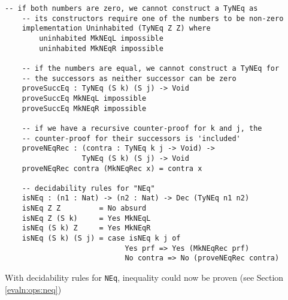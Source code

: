     \begin{lstlisting}[caption={Decidability rules for inequality}]
    -- if both numbers are zero, we cannot construct a TyNEq as
    -- its constructors require one of the numbers to be non-zero
    implementation Uninhabited (TyNEq Z Z) where
        uninhabited MkNEqL impossible
        uninhabited MkNEqR impossible

    -- if the numbers are equal, we cannot construct a TyNEq for      
    -- the successors as neither successor can be zero
    proveSuccEq : TyNEq (S k) (S j) -> Void
    proveSuccEq MkNEqL impossible
    proveSuccEq MkNEqR impossible
    
    -- if we have a recursive counter-proof for k and j, the
    -- counter-proof for their successors is 'included'
    proveNEqRec : (contra : TyNEq k j -> Void) ->
                  TyNEq (S k) (S j) -> Void
    proveNEqRec contra (MkNEqRec x) = contra x
    
    -- decidability rules for "NEq"
    isNEq : (n1 : Nat) -> (n2 : Nat) -> Dec (TyNEq n1 n2)
    isNEq Z Z         = No absurd
    isNEq Z (S k)     = Yes MkNEqL
    isNEq (S k) Z     = Yes MkNEqR
    isNEq (S k) (S j) = case isNEq k j of
                            Yes prf => Yes (MkNEqRec prf)
                            No contra => No (proveNEqRec contra)
    \end{lstlisting}
    
    With decidability rules for \texttt{NEq}, inequality could now be proven (see Section \ref{evaln:ops:neq})
    
